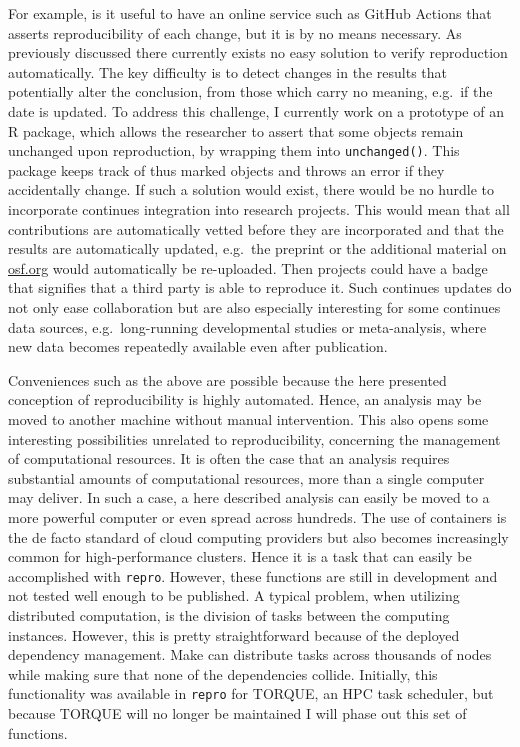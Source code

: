 \documentclass[12pt,a4paper,twoside]{article}
\begin{document}
For example, is it useful to have an online service such as GitHub Actions that asserts reproducibility of each change, but it is by no means necessary.
As previously discussed there currently exists no easy solution to verify reproduction automatically.
The key difficulty is to detect changes in the results that potentially alter the conclusion, from those which carry no meaning, e.g.~if the date is updated.
To address this challenge, I currently work on a prototype of an R package, which allows the researcher to assert that some objects remain unchanged upon reproduction, by wrapping them into \texttt{unchanged()}.
This package keeps track of thus marked objects and throws an error if they accidentally change.
If such a solution would exist, there would be no hurdle to incorporate continues integration into research projects.
This would mean that all contributions are automatically vetted before they are incorporated and that the results are automatically updated, e.g.~the preprint or the additional material on \url{osf.org} would automatically be re-uploaded.
Then projects could have a badge that signifies that a third party is able to reproduce it.
Such continues updates do not only ease collaboration but are also especially interesting for some continues data sources, e.g.~long-running developmental studies or meta-analysis, where new data becomes repeatedly available even after publication.

Conveniences such as the above are possible because the here presented conception of reproducibility is highly automated.
Hence, an analysis may be moved to another machine without manual intervention.
This also opens some interesting possibilities unrelated to reproducibility, concerning the management of computational resources.
It is often the case that an analysis requires substantial amounts of computational resources, more than a single computer may deliver.
In such a case, a here described analysis can easily be moved to a more powerful computer or even spread across hundreds.
The use of containers is the de facto standard of cloud computing providers but also becomes increasingly common for high-performance clusters.
Hence it is a task that can easily be accomplished with \texttt{repro}.
However, these functions are still in development and not tested well enough to be published.
A typical problem, when utilizing distributed computation, is the division of tasks between the computing instances.
However, this is pretty straightforward because of the deployed dependency management.
Make can distribute tasks across thousands of nodes while making sure that none of the dependencies collide.
Initially, this functionality was available in \texttt{repro} for TORQUE, an HPC task scheduler, but because TORQUE will no longer be maintained I will phase out this set of functions.
\end{document}
